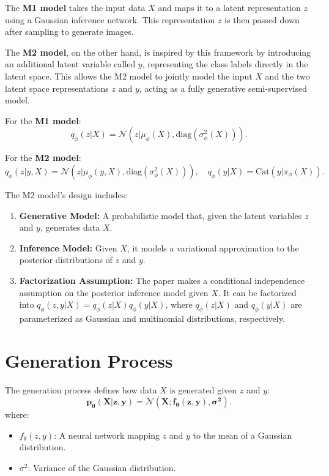 \documentclass{article}
\begin{document}
The \textbf{M1 model} takes the input data $X$ and maps it to a latent representation $z$ using a Gaussian inference network. This representation $z$ is then passed down after sampling to generate images.

The \textbf{M2 model}, on the other hand, is inspired by this framework by introducing an additional latent variable called $y$, representing the class labels directly in the latent space. This allows the M2 model to jointly model the input $X$ and the two latent space representations $z$ and $y$, acting as a fully generative semi-supervised model.

For the \textbf{M1 model}:
\[
q_\phi(z|X) = \mathcal{N}(z | \mu_\phi(X), \text{diag}(\sigma^2_\phi(X))). 
\]

For the \textbf{M2 model}:
\[
q_\phi(z|y, X) = \mathcal{N}(z | \mu_\phi(y, X), \text{diag}(\sigma^2_\phi(X))), \quad q_\phi(y|X) = \text{Cat}(y | \pi_\phi(X)).
\]

The M2 model's design includes:
\begin{enumerate}
    \item \textbf{Generative Model:} A probabilistic model that, given the latent variables $z$ and $y$, generates data $X$.
    \item \textbf{Inference Model:} Given $X$, it models a variational approximation to the posterior distributions of $z$ and $y$.
    \item \textbf{Factorization Assumption:} The paper makes a conditional independence assumption on the posterior inference model given $X$. It can be factorized into $q_\phi(z, y|X) = q_\phi(z|X)q_\phi(y|X)$, where $q_\phi(z|X)$ and $q_\phi(y|X)$ are parameterized as Gaussian and multinomial distributions, respectively.
\end{enumerate}

\section*{Generation Process}

The generation process defines how data $X$ is generated given $z$ and $y$:
\[
\bm{p_\theta(X|z, y) = \mathcal{N}(X; f_\theta(z, y), \sigma^2).} \tag{1}
\]
where:
\begin{itemize}
    \item $f_\theta(z, y)$: A neural network mapping $z$ and $y$ to the mean of a Gaussian distribution.
    \item $\sigma^2$: Variance of the Gaussian distribution.
\end{itemize}
\end{document}
